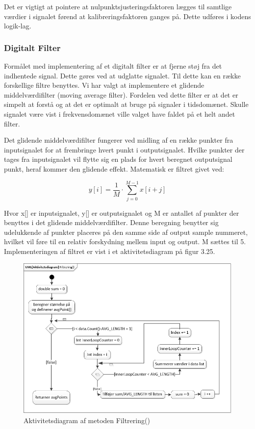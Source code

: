 Det er vigtigt at pointere at nulpunktsjusteringsfaktoren lægges til samtlige værdier i signalet førend at kalibreringsfaktoren ganges på. Dette udføres i kodens logik-lag.
 
\subsubsection{Digitalt Filter}
\cite{DSBsoft} Formålet med implementering af et digitalt filter er at fjerne støj fra det indhentede signal. Dette gøres ved at udglatte signalet. Til dette kan en række forskellige filtre benyttes. Vi har valgt at implementere et glidende middelværdifilter (moving average filter). Fordelen ved dette filter er at det er simpelt at forstå og at det er optimalt at bruge på signaler i tidsdomænet. Skulle signalet være vist i frekvensdomænet ville valget have faldet på et helt andet filter. 

Det glidende middelværdifilter fungerer ved midling af en række punkter fra inputsignalet for at frembringe hvert punkt i outputsignalet. Hvilke punkter der tages fra inputsignalet vil flytte sig en plads for hvert beregnet outputsignal punkt, heraf kommer den glidende effekt. Matematisk er filtret givet ved:
\begin{ceqn}
\begin{equation}
y[i]=\frac{1}{M}\cdot\sum\limits_{j=0}^{M-1} x[i+j]
\end{equation}
\end{ceqn}

Hvor x[] er inputsignalet, y[] er outputsignalet og M er antallet af punkter der benyttes i det glidende middelværdifilter. Denne beregning benytter sig udelukkende af punkter placeres på den samme side af output sample nummeret, hvilket vil føre til en relativ forskydning mellem input og output. M sættes til 5. Implementeringen af filtret er vist i et aktivitetsdiagram på figur 3.25.

\begin{figure}[H]
	\centering
	\includegraphics[width=1.0\textwidth]{Figurer/AktFiltrering}
	\caption{Aktivitetsdiagram af metoden Filtrering()}
\end{figure}


